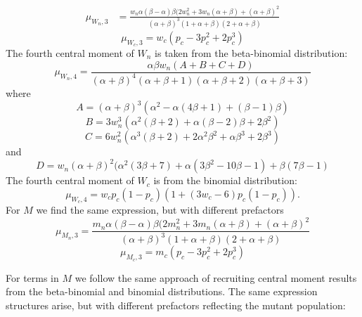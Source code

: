 \documentclass{article}
\begin{document}
\begin{appendices}
\begin{equation}
    \begin{split}
    \mu_{W_n,3}&=\frac{w_n\alpha(\beta-\alpha)\beta(2w_n^2+3w_n(\alpha+\beta)+(\alpha+\beta)^2}{(\alpha+\beta)^3(1+\alpha+\beta)(2+\alpha+\beta)}
    \end{split}
\end{equation}
\begin{equation}
    \mu_{W_c,3}=w_c(p_c-3p_c^2+2p_c^3)
\end{equation}
The fourth central moment of $W_n$ is taken from the beta-binomial distribution:
\begin{equation}
    \mu_{W_n,4}=\frac{\alpha\beta w_n(A+B+C+D)}{(\alpha +\beta )^4 (\alpha +\beta +1) (\alpha +\beta +2) (\alpha +\beta +3)}
\end{equation}
where
\begin{equation*}
    A = (\alpha +\beta )^3 \left(\alpha ^2-\alpha  (4 \beta +1)+(\beta -1) \beta \right)
\end{equation*}
\begin{equation*}
    B = 3w_n^3\left(\alpha ^2 (\beta +2)+\alpha  (\beta -2) \beta +2 \beta ^2\right)
\end{equation*}
\begin{equation*}
    C = 6w_n^2\left(\alpha ^3 (\beta +2)+2 \alpha ^2 \beta ^2+\alpha  \beta ^3+2 \beta ^3\right)
\end{equation*}
and
\begin{equation*}
    D = w_n(\alpha +\beta )^2(\alpha ^2 (3 \beta +7)+\alpha  (3 \beta ^2-10 \beta -1)+\beta  (7 \beta -1)
\end{equation*}
The fourth central moment of $W_c$ is from the binomial distribution:
\begin{equation}
    \mu_{W_c,4}=w_cp_c(1-p_c)(1+(3w_c-6)p_c(1-p_c)).
\end{equation}
For $M$ we find the same expression, but with different prefactors
\begin{equation}
    \mu_{M_n,3}=\frac{m_n\alpha(\beta-\alpha)\beta(2m_n^2+3m_n(\alpha+\beta)+(\alpha+\beta)^2}{(\alpha+\beta)^3(1+\alpha+\beta)(2+\alpha+\beta)}
\end{equation}
\begin{equation}
    \mu_{M_c,3}=m_c(p_c-3p_c^2+2p_c^3)
\end{equation}

For terms in $M$ we follow the same approach of recruiting central moment results from the beta-binomial and binomial distributions. The same expression structures arise, but with different prefactors reflecting the mutant population:


\end{appendices}
\end{document}
